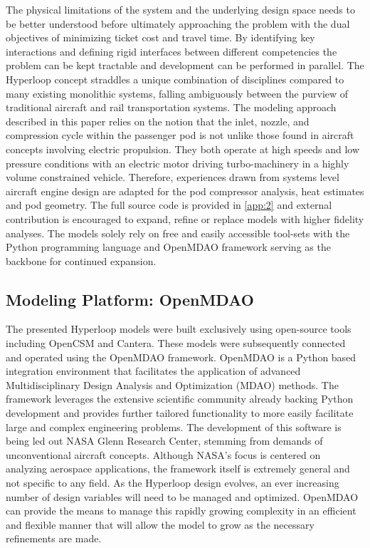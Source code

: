 \documentclass[heading.tex]{subfiles}
\begin{document}
The physical limitations of the system and the underlying design space needs to be better understood before ultimately approaching the
problem with the dual objectives of minimizing ticket cost and travel time. By identifying key interactions and defining rigid interfaces between
different competencies the problem can
be kept tractable and development can be performed in parallel. The Hyperloop concept straddles a unique combination of disciplines
compared to many existing monolithic systems, falling ambiguously between the purview of
traditional aircraft and rail transportation systems. The modeling
approach described in this paper relies on the notion that the inlet, nozzle, and compression cycle within the passenger pod is not unlike those
found in aircraft concepts involving electric propulsion. They both operate at high speeds and low pressure conditions with an electric motor
driving turbo-machinery in a highly volume constrained vehicle. Therefore, experiences drawn from systems level aircraft engine
design are adapted for the pod compressor analysis, heat estimates and pod geometry. The full source code is provided in
 \cref{app:2} and external contribution is encouraged to expand, refine or replace models with higher fidelity analyses. The models solely rely on
free and easily accessible tool-sets with the Python programming language and OpenMDAO  framework serving as the backbone for continued expansion.  

\subsection{Modeling Platform: OpenMDAO}


The presented Hyperloop models were built exclusively using open-source tools including OpenCSM
 and
Cantera. These models were subsequently connected and operated using the OpenMDAO framework. OpenMDAO is a Python based
integration environment that facilitates the application of advanced Multidisciplinary Design Analysis and Optimization (MDAO) methods.
The framework leverages the extensive scientific community already backing Python development and provides further tailored functionality
to more easily facilitate large and complex engineering problems. The development of this software is being led out NASA Glenn Research
Center, stemming from demands of unconventional aircraft concepts. Although NASA's
focus is centered on analyzing aerospace applications, the framework itself is extremely general and not specific to any field. As the
Hyperloop design evolves, an ever increasing number of design variables will need to be managed and optimized. OpenMDAO can provide
the means to manage this rapidly growing complexity in an efficient and flexible manner that will allow the model to grow as the necessary
refinements are made.
\end{document}
